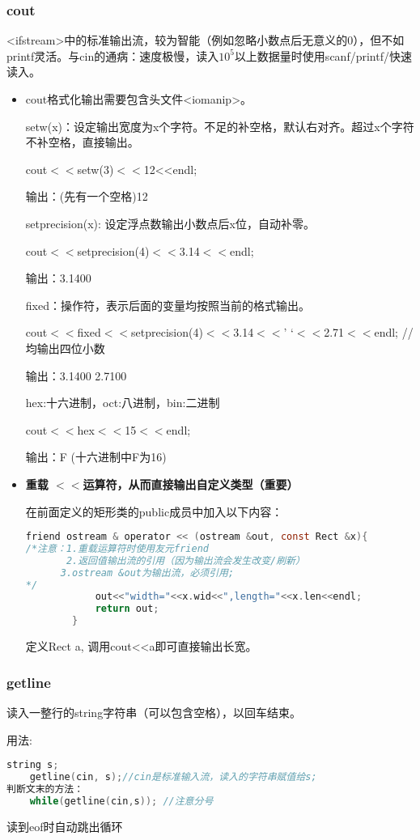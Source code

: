 \documentclass[UTF8]{ctexart}
\begin{document}
\subsubsection{cout}
<ifstream>中的标准输出流，较为智能（例如忽略小数点后无意义的0），但不如printf灵活。与cin的通病：速度极慢，读入$10^5$以上数据量时使用scanf/printf/快速读入。
\begin{itemize}
    \item cout格式化输出需要包含头文件<iomanip>。

setw(x)：设定输出宽度为x个字符。不足的补空格，默认右对齐。超过x个字符不补空格，直接输出。

cout$<<$setw(3)$<<$12<<endl;

输出：(先有一个空格)12

setprecision(x): 设定浮点数输出小数点后x位，自动补零。

cout$<<$setprecision(4)$<<$3.14$<<$endl;

输出：3.1400

fixed：操作符，表示后面的变量均按照当前的格式输出。

cout$<<$fixed$<<$setprecision(4)$<<$3.14$<<$’ ‘$<<$2.71$<<$endl; //均输出四位小数

输出：3.1400 2.7100

hex:十六进制，oct:八进制，bin:二进制

cout$<<$hex$<<$15$<<$endl;

输出：F (十六进制中F为16)

\item \textbf{重载
$<<$运算符，从而直接输出自定义类型（重要）}

在前面定义的矩形类的public成员中加入以下内容：
\begin{lstlisting}[language = C,basicstyle=\small\ttfamily]
friend ostream & operator << (ostream &out, const Rect &x){
/*注意：1.重载运算符时使用友元friend 
       2.返回值输出流的引用（因为输出流会发生改变/刷新）
	  3.ostream &out为输出流，必须引用; 
*/
			out<<"width="<<x.wid<<",length="<<x.len<<endl;
			return out; 
		}
\end{lstlisting}
定义Rect a, 调用cout<<a即可直接输出长宽。
\end{itemize}
\subsubsection{getline}
读入一整行的string字符串（可以包含空格），以回车结束。

用法:
   \begin{lstlisting}[language = C,basicstyle=\small\ttfamily] 
    string s;
    getline(cin, s);//cin是标准输入流，读入的字符串赋值给s;
判断文末的方法：
	while(getline(cin,s)); //注意分号
    \end{lstlisting}
	读到eof时自动跳出循环
\end{document}
